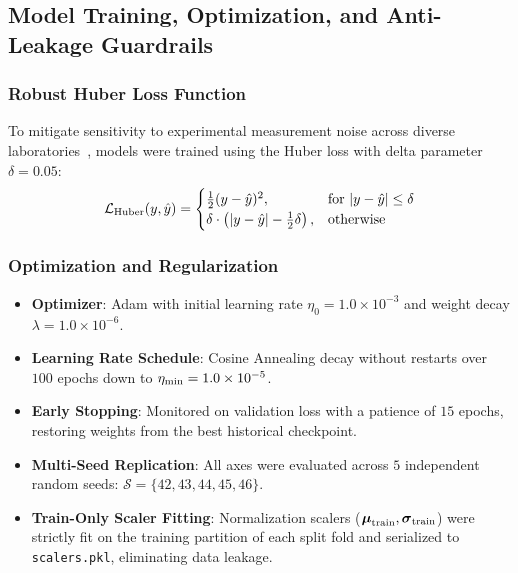 \subsection{Model Training, Optimization, and Anti-Leakage Guardrails}
\label{subsec:training_protocol}

\subsubsection{Robust Huber Loss Function}
To mitigate sensitivity to experimental measurement noise across diverse laboratories~\cite{Sarmiento2021_Consistency}, models were trained using the Huber loss with delta parameter $\delta = 0.05$:
\begin{equation}
    \mathcal{L}_{\rm Huber}(y, \hat{y}) = \begin{cases} 
        \frac{1}{2} (y - \hat{y})^2, & \text{for } |y - \hat{y}| \le \delta \\ 
        \delta \cdot \left(|y - \hat{y}| - \frac{1}{2}\delta\right), & \text{otherwise} 
    \end{cases}
\end{equation}

\subsubsection{Optimization and Regularization}
\begin{itemize}
    \item \textbf{Optimizer}: Adam with initial learning rate $\eta_0 = 1.0 \times 10^{-3}$ and weight decay $\lambda = 1.0 \times 10^{-6}$.
    \item \textbf{Learning Rate Schedule}: Cosine Annealing decay without restarts over $100$ epochs down to $\eta_{\rm min} = 1.0 \times 10^{-5}$.
    \item \textbf{Early Stopping}: Monitored on validation loss with a patience of $15$ epochs, restoring weights from the best historical checkpoint.
    \item \textbf{Multi-Seed Replication}: All axes were evaluated across $5$ independent random seeds: $\mathcal{S} = \{42, 43, 44, 45, 46\}$.
    \item \textbf{Train-Only Scaler Fitting}: Normalization scalers ($\boldsymbol{\mu}_{\rm train}, \boldsymbol{\sigma}_{\rm train}$) were strictly fit on the training partition of each split fold and serialized to \texttt{scalers.pkl}, eliminating data leakage.
\end{itemize}

